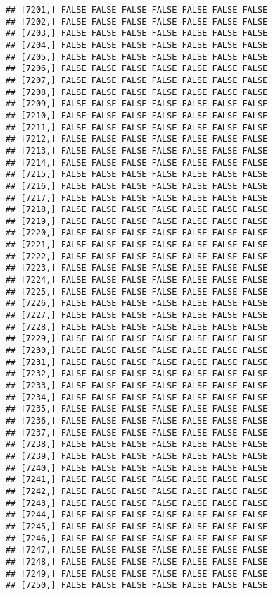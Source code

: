 \documentclass[
]{article}
\begin{document}
\begin{verbatim}
## [7201,] FALSE FALSE FALSE FALSE FALSE FALSE FALSE
## [7202,] FALSE FALSE FALSE FALSE FALSE FALSE FALSE
## [7203,] FALSE FALSE FALSE FALSE FALSE FALSE FALSE
## [7204,] FALSE FALSE FALSE FALSE FALSE FALSE FALSE
## [7205,] FALSE FALSE FALSE FALSE FALSE FALSE FALSE
## [7206,] FALSE FALSE FALSE FALSE FALSE FALSE FALSE
## [7207,] FALSE FALSE FALSE FALSE FALSE FALSE FALSE
## [7208,] FALSE FALSE FALSE FALSE FALSE FALSE FALSE
## [7209,] FALSE FALSE FALSE FALSE FALSE FALSE FALSE
## [7210,] FALSE FALSE FALSE FALSE FALSE FALSE FALSE
## [7211,] FALSE FALSE FALSE FALSE FALSE FALSE FALSE
## [7212,] FALSE FALSE FALSE FALSE FALSE FALSE FALSE
## [7213,] FALSE FALSE FALSE FALSE FALSE FALSE FALSE
## [7214,] FALSE FALSE FALSE FALSE FALSE FALSE FALSE
## [7215,] FALSE FALSE FALSE FALSE FALSE FALSE FALSE
## [7216,] FALSE FALSE FALSE FALSE FALSE FALSE FALSE
## [7217,] FALSE FALSE FALSE FALSE FALSE FALSE FALSE
## [7218,] FALSE FALSE FALSE FALSE FALSE FALSE FALSE
## [7219,] FALSE FALSE FALSE FALSE FALSE FALSE FALSE
## [7220,] FALSE FALSE FALSE FALSE FALSE FALSE FALSE
## [7221,] FALSE FALSE FALSE FALSE FALSE FALSE FALSE
## [7222,] FALSE FALSE FALSE FALSE FALSE FALSE FALSE
## [7223,] FALSE FALSE FALSE FALSE FALSE FALSE FALSE
## [7224,] FALSE FALSE FALSE FALSE FALSE FALSE FALSE
## [7225,] FALSE FALSE FALSE FALSE FALSE FALSE FALSE
## [7226,] FALSE FALSE FALSE FALSE FALSE FALSE FALSE
## [7227,] FALSE FALSE FALSE FALSE FALSE FALSE FALSE
## [7228,] FALSE FALSE FALSE FALSE FALSE FALSE FALSE
## [7229,] FALSE FALSE FALSE FALSE FALSE FALSE FALSE
## [7230,] FALSE FALSE FALSE FALSE FALSE FALSE FALSE
## [7231,] FALSE FALSE FALSE FALSE FALSE FALSE FALSE
## [7232,] FALSE FALSE FALSE FALSE FALSE FALSE FALSE
## [7233,] FALSE FALSE FALSE FALSE FALSE FALSE FALSE
## [7234,] FALSE FALSE FALSE FALSE FALSE FALSE FALSE
## [7235,] FALSE FALSE FALSE FALSE FALSE FALSE FALSE
## [7236,] FALSE FALSE FALSE FALSE FALSE FALSE FALSE
## [7237,] FALSE FALSE FALSE FALSE FALSE FALSE FALSE
## [7238,] FALSE FALSE FALSE FALSE FALSE FALSE FALSE
## [7239,] FALSE FALSE FALSE FALSE FALSE FALSE FALSE
## [7240,] FALSE FALSE FALSE FALSE FALSE FALSE FALSE
## [7241,] FALSE FALSE FALSE FALSE FALSE FALSE FALSE
## [7242,] FALSE FALSE FALSE FALSE FALSE FALSE FALSE
## [7243,] FALSE FALSE FALSE FALSE FALSE FALSE FALSE
## [7244,] FALSE FALSE FALSE FALSE FALSE FALSE FALSE
## [7245,] FALSE FALSE FALSE FALSE FALSE FALSE FALSE
## [7246,] FALSE FALSE FALSE FALSE FALSE FALSE FALSE
## [7247,] FALSE FALSE FALSE FALSE FALSE FALSE FALSE
## [7248,] FALSE FALSE FALSE FALSE FALSE FALSE FALSE
## [7249,] FALSE FALSE FALSE FALSE FALSE FALSE FALSE
## [7250,] FALSE FALSE FALSE FALSE FALSE FALSE FALSE

\end{verbatim}
\end{document}
